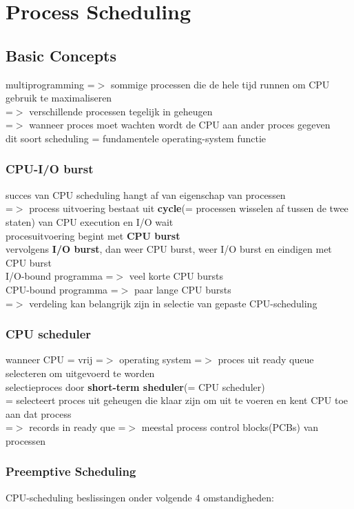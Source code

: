 \documentclass{report}
\begin{document}
\chapter{Process Scheduling}
\section{Basic Concepts}
multiprogramming =$>$ sommige processen die de hele tijd runnen om CPU gebruik te maximaliseren
\\=$>$ verschillende processen tegelijk in geheugen
\\=$>$ wanneer proces moet wachten wordt de CPU aan ander proces gegeven
\\dit soort scheduling = fundamentele operating-system functie
\subsection{CPU-I/O burst}
succes van CPU scheduling hangt af van eigenschap van processen
\\=$>$ process uitvoering bestaat uit \textbf{cycle}(= processen wisselen af tussen de twee staten) van CPU execution en I/O wait
\\procesuitvoering begint met \textbf{CPU burst}
\\vervolgens \textbf{I/O burst}, dan weer CPU burst, weer I/O burst en eindigen met CPU burst
\\I/O-bound programma =$>$ veel korte CPU bursts
\\CPU-bound programma =$>$ paar lange CPU bursts
\\=$>$ verdeling kan belangrijk zijn in selectie van gepaste CPU-scheduling

\subsection{CPU scheduler}
wanneer CPU = vrij =$>$ operating system =$>$ proces uit ready queue selecteren om uitgevoerd te worden
\\selectieproces door \textbf{short-term sheduler}(= CPU scheduler)
\\= selecteert proces uit geheugen die klaar zijn om uit te voeren en kent CPU toe aan dat process
\\=$>$ records in ready que =$>$ meestal process control blocks(PCBs) van processen

\subsection{Preemptive Scheduling}
CPU-scheduling beslissingen onder volgende 4 omstandigheden:
\end{document}
